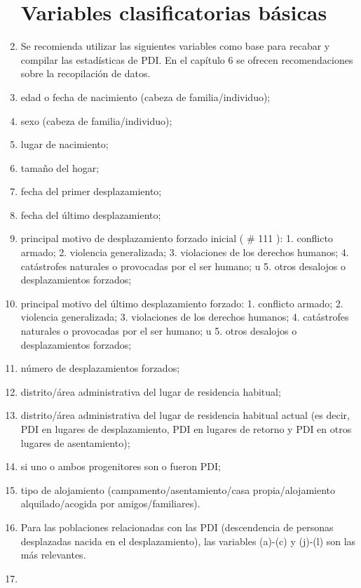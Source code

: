 \documentclass[
]{book}
\begin{document}
\begin{enumerate}
{  \section{Variables clasificatorias básicas}\label{variables-clasificatorias-buxe1sicas}}
\item
  Se recomienda utilizar las siguientes variables como base para recabar y compilar las estadísticas de PDI. En el capítulo 6 se ofrecen recomendaciones sobre la recopilación de datos.
\item
  edad o fecha de nacimiento (cabeza de familia/individuo);
\item
  sexo (cabeza de familia/individuo);
\item
  lugar de nacimiento;
\item
  tamaño del hogar;
\item
  fecha del primer desplazamiento;
\item
  fecha del último desplazamiento;
\item
  principal motivo de desplazamiento forzado inicial (
  \# 111
  ):
  1. conflicto armado;
  2. violencia generalizada;
  3. violaciones de los derechos humanos;
  4. catástrofes naturales o provocadas por el ser humano; u
  5. otros desalojos o desplazamientos forzados;
\item
  principal motivo del último desplazamiento forzado:
  1. conflicto armado;
  2. violencia generalizada;
  3. violaciones de los derechos humanos;
  4. catástrofes naturales o provocadas por el ser humano; u
  5. otros desalojos o desplazamientos forzados;
\item
  número de desplazamientos forzados;
\item
  distrito/área administrativa del lugar de residencia habitual;
\item
  distrito/área administrativa del lugar de residencia habitual actual (es decir, PDI en lugares de desplazamiento, PDI en lugares de retorno y PDI en otros lugares de asentamiento);
\item
  si uno o ambos progenitores son o fueron PDI;
\item
  tipo de alojamiento (campamento/asentamiento/casa propia/alojamiento alquilado/acogida por amigos/familiares).
\item
  Para las poblaciones relacionadas con las PDI (descendencia de personas desplazadas nacida en el desplazamiento), las variables (a)-(c) y (j)-(l) son las más relevantes.
\item ~
  \hypertarget{flujos-de-pdi-y-poblaciones-relacionadas-con-ellas}{%
}
\end{enumerate}
\end{document}
